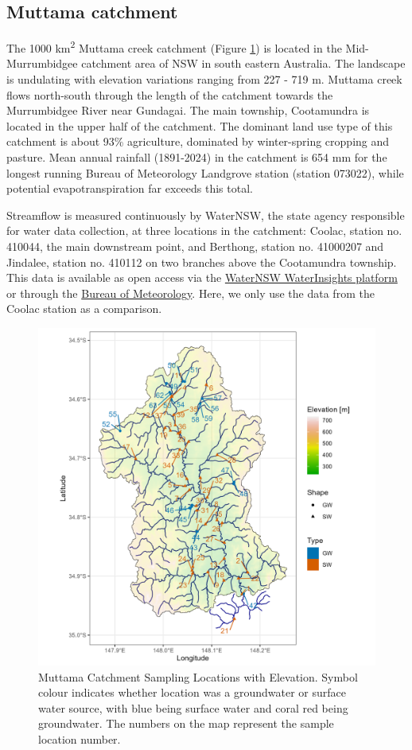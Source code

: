 \documentclass[, manuscript]{copernicus}
\begin{document}
\subsection{Muttama catchment}

The 1000 km\textsuperscript{2} Muttama creek catchment (Figure
\ref{fig:samplemap}) is located in the Mid-Murrumbidgee catchment area
of NSW in south eastern Australia. The landscape is undulating with
elevation variations ranging from 227 - 719 m. Muttama creek flows
north-south through the length of the catchment towards the Murrumbidgee
River near Gundagai. The main township, Cootamundra is located in the
upper half of the catchment. The dominant land use type of this
catchment is about 93\% agriculture, dominated by winter-spring cropping
and pasture. Mean annual rainfall (1891-2024) in the catchment is 654 mm
for the longest running Bureau of Meteorology Landgrove station (station
073022), while potential evapotranspiration far exceeds this total.

Streamflow is measured continuously by WaterNSW, the state agency
responsible for water data collection, at three locations in the
catchment: Coolac, station no. 410044, the main downstream point, and
Berthong, station no. 41000207 and Jindalee, station no. 410112 on two
branches above the Cootamundra township. This data is available as open
access via the \href{https://waterinsights.waternsw.com.au/}{WaterNSW
WaterInsights platform} or through the
\href{http://bom.gov.au/waterdata/}{Bureau of Meteorology}. Here, we
only use the data from the Coolac station as a comparison.

\begin{figure}
\includegraphics[width=0.8\linewidth]{Figures/gw_or_sw_map} \caption{Muttama Catchment Sampling Locations with Elevation. Symbol colour indicates whether location was a groundwater or surface water source, with blue being surface water and coral red being groundwater. The numbers on the map represent the sample location number.}\label{fig:samplemap}
\end{figure}
\end{document}
